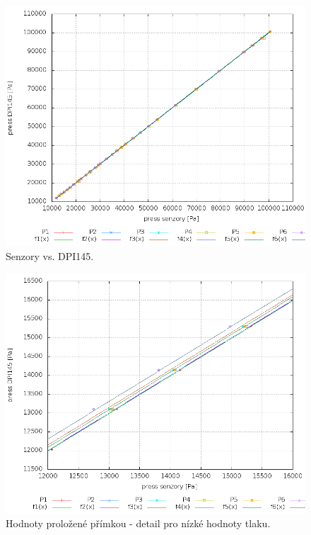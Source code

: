 \documentclass[12pt,a4paper,oneside]{article}
\begin{document}
\begin{figure} [htbp]
\centering
\includegraphics [width=130mm, origin=c] {./img/KorekceTlaku.png}
\caption{Senzory vs. DPI145.}
\label{KorekceTlaku}
\end{figure}

\begin{figure} [htbp]
\centering
\includegraphics [width=130mm, origin=c] {./img/KorekceTlakuZoom.png}
\caption{Hodnoty proložené přímkou - detail pro nízké hodnoty tlaku.}
\label{KorekceTlakuZoom}
\end{figure}
\end{document}
